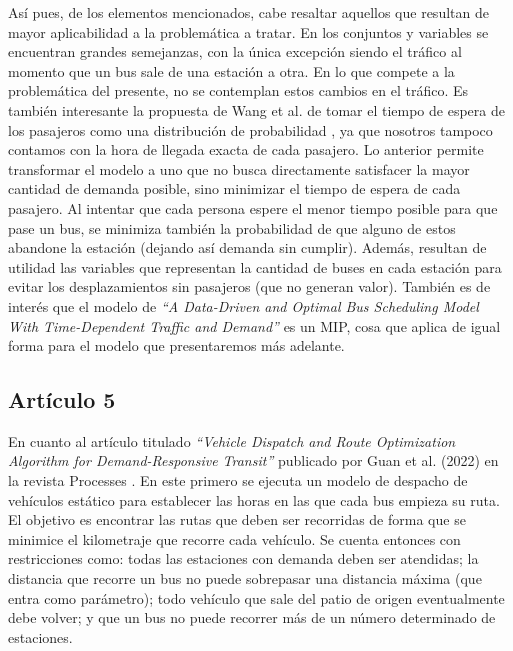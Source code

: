 \documentclass[preprint,11pt]{elsarticle}
\begin{document}
Así pues, de los elementos mencionados, cabe resaltar aquellos que resultan de mayor aplicabilidad a la problemática a tratar. En los conjuntos y variables se encuentran grandes semejanzas, con la única excepción siendo el tráfico al momento que un bus sale de una estación a otra. En lo que compete a la problemática del presente, no se contemplan estos cambios en el tráfico. Es también interesante la propuesta de Wang et al. de tomar el tiempo de espera de los pasajeros como una distribución de probabilidad \parencite{wang2017}, ya que nosotros tampoco contamos con la hora de llegada exacta de cada pasajero. Lo anterior permite transformar el modelo a uno que no busca directamente satisfacer la mayor cantidad de demanda posible, sino minimizar el tiempo de espera de cada pasajero. Al intentar que cada persona espere el menor tiempo posible para que pase un bus, se minimiza también la probabilidad de que alguno de estos abandone la estación (dejando así demanda sin cumplir). Además, resultan de utilidad las variables que representan la cantidad de buses en cada estación para evitar los desplazamientos sin pasajeros (que no generan valor). También es de interés que el modelo de \textit{“A Data-Driven and Optimal Bus Scheduling Model With Time-Dependent Traffic and Demand”} es un MIP, cosa que aplica de igual forma para el modelo que presentaremos más adelante.


\subsection*{Artículo 5}

En cuanto al artículo titulado \textit{“Vehicle Dispatch and Route Optimization Algorithm for Demand-Responsive Transit”} publicado por Guan et al. (2022) en la revista Processes \parencite{guan2022}. En este primero se ejecuta un modelo de despacho de vehículos estático para establecer las horas en las que cada bus empieza su ruta. El objetivo es encontrar las rutas que deben ser recorridas de forma que se minimice el kilometraje que recorre cada vehículo. Se cuenta entonces con restricciones como: todas las estaciones con demanda deben ser atendidas; la distancia que recorre un bus no puede sobrepasar una distancia máxima (que entra como parámetro); todo vehículo que sale del patio de origen eventualmente debe volver; y que un bus no puede recorrer más de un número determinado de estaciones. 
\end{document}
